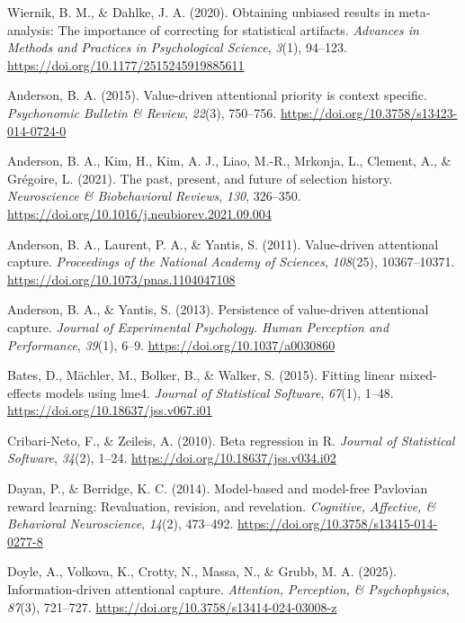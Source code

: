 \documentclass[
  man,
  floatsintext,
  longtable,
  nolmodern,
  notxfonts,
  notimes,
  colorlinks=true,linkcolor=blue,citecolor=blue,urlcolor=blue]{apa7}
\newlength{\cslhangindent}
\newenvironment{CSLReferences}[2] %
 {\begin{list}{}{%
  \setlength{\itemindent}{0pt}
  \setlength{\leftmargin}{0pt}
  \setlength{\parsep}{0pt}
  \ifodd #1
   \setlength{\leftmargin}{\cslhangindent}
   \setlength{\itemindent}{-1\cslhangindent}
  \fi
  \setlength{\itemsep}{#2\baselineskip}}}
 {\end{list}}
\begin{document}
\begin{CSLReferences}{1}{0}
Wiernik, B. M., \& Dahlke, J. A. (2020). Obtaining unbiased results in
meta-analysis: The importance of correcting for statistical artifacts.
\emph{Advances in Methods and Practices in Psychological Science},
\emph{3}(1), 94--123. \url{https://doi.org/10.1177/2515245919885611}

Anderson, B. A. (2015). Value-driven attentional priority is context
specific. \emph{Psychonomic Bulletin \& Review}, \emph{22}(3), 750--756.
\url{https://doi.org/10.3758/s13423-014-0724-0}

Anderson, B. A., Kim, H., Kim, A. J., Liao, M.-R., Mrkonja, L., Clement,
A., \& Grégoire, L. (2021). The past, present, and future of selection
history. \emph{Neuroscience \& Biobehavioral Reviews}, \emph{130},
326--350. \url{https://doi.org/10.1016/j.neubiorev.2021.09.004}

Anderson, B. A., Laurent, P. A., \& Yantis, S. (2011). Value-driven
attentional capture. \emph{Proceedings of the National Academy of
Sciences}, \emph{108}(25), 10367--10371.
\url{https://doi.org/10.1073/pnas.1104047108}

Anderson, B. A., \& Yantis, S. (2013). Persistence of value-driven
attentional capture. \emph{Journal of Experimental Psychology. Human
Perception and Performance}, \emph{39}(1), 6--9.
\url{https://doi.org/10.1037/a0030860}

Bates, D., Mächler, M., Bolker, B., \& Walker, S. (2015). Fitting linear
mixed-effects models using {lme4}. \emph{Journal of Statistical
Software}, \emph{67}(1), 1--48.
\url{https://doi.org/10.18637/jss.v067.i01}

Cribari-Neto, F., \& Zeileis, A. (2010). Beta regression in {R}.
\emph{Journal of Statistical Software}, \emph{34}(2), 1--24.
\url{https://doi.org/10.18637/jss.v034.i02}

Dayan, P., \& Berridge, K. C. (2014). Model-based and model-free
Pavlovian reward learning: Revaluation, revision, and revelation.
\emph{Cognitive, Affective, \& Behavioral Neuroscience}, \emph{14}(2),
473--492. \url{https://doi.org/10.3758/s13415-014-0277-8}

Doyle, A., Volkova, K., Crotty, N., Massa, N., \& Grubb, M. A. (2025).
Information-driven attentional capture. \emph{Attention, Perception, \&
Psychophysics}, \emph{87}(3), 721--727.
\url{https://doi.org/10.3758/s13414-024-03008-z}


\end{CSLReferences}
\end{document}
